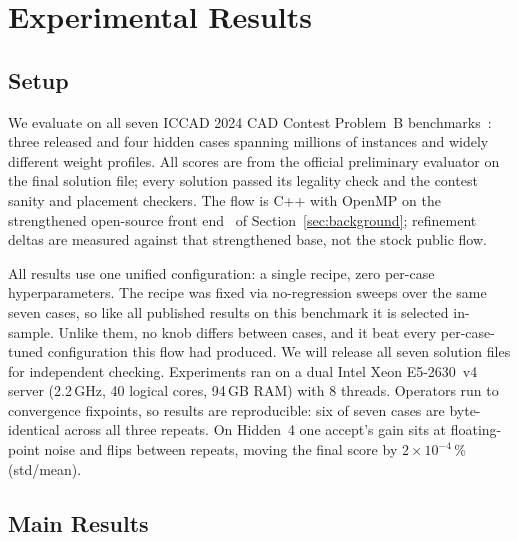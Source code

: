 \section{Experimental Results}\label{sec:experiments}

\subsection{Setup}\label{sec:setup}

We evaluate on all seven ICCAD 2024 CAD Contest Problem~B benchmarks~\cite{yang2024contest,fang2024overview}: three released and four hidden cases spanning millions of instances and widely different weight profiles. All scores are from the official preliminary evaluator on the final solution file; every solution passed its legality check and the contest sanity and placement checkers. The flow is C++ with OpenMP on the strengthened open-source front end~\cite{baselineRepo} of Section~\ref{sec:background}; refinement deltas are measured against that strengthened base, not the stock public flow.

All results use one unified configuration: a single recipe, zero per-case hyperparameters. The recipe was fixed via no-regression sweeps over the same seven cases, so like all published results on this benchmark it is selected in-sample. Unlike them, no knob differs between cases, and it beat every per-case-tuned configuration this flow had produced. We will release all seven solution files for independent checking. Experiments ran on a dual Intel Xeon E5-2630~v4 server (2.2\,GHz, 40 logical cores, 94\,GB RAM) with 8 threads. Operators run to convergence fixpoints, so results are reproducible: six of seven cases are byte-identical across all three repeats. On Hidden~4 one accept's gain sits at floating-point noise and flips between repeats, moving the final score by $2{\times}10^{-4}$\,\% (std/mean).

\subsection{Main Results}\label{sec:mainresults}

